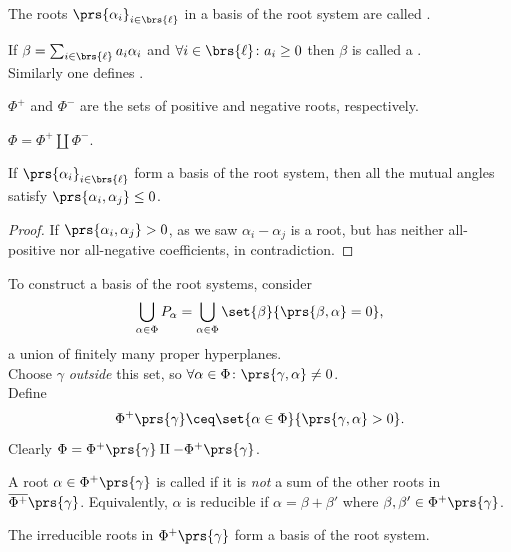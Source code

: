 \documentclass[10pt,a4paper,twoside,openany,hidelinks]{book}
\begin{document}
\begin{definition}
The roots $\prs{\alpha_i}_{i \in \brs{\ell}}$ in a basis of the root system are called .
\end{definition}

\begin{definition}
If $\beta = \sum_{i \in \brs{\ell}} a_i \alpha_i$ and $\forall i \in \brs{\ell} \colon a_i \geq 0$ then $\beta$ is called a .\\
Similarly one defines .
\end{definition}
\begin{definition}
$\Phi^+$ and $\Phi^-$ are the sets of positive and negative roots, respectively.
\end{definition}
\begin{remark}
$\Phi = \Phi^+ \amalg \Phi^-$.
\end{remark}
\begin{proposition}
If $\prs{\alpha_i}_{i\in\brs{\ell}}$ form a basis of the root system, then all the mutual angles satisfy $\prs{\alpha_i, \alpha_j} \leq 0$.
\end{proposition}

\begin{proof}
If $\prs{\alpha_i, \alpha_j} > 0$, as we saw $\alpha_i - \alpha_j$ is a root, but has neither all-positive nor all-negative coefficients, in contradiction.
\end{proof}

To construct a basis of the root systems, consider
\[\bigcup_{\alpha \in \Phi} P_{\alpha} = \bigcup_{\alpha \in \Phi} \set{\beta}{\prs{\beta,\alpha} = 0} \text{,}\]
a union of finitely many proper hyperplanes.\\
Choose $\gamma$ \emph{outside} this set, so $\forall \alpha \in \Phi \colon \prs{\gamma,\alpha} \neq 0$.\\
Define \[\Phi^+\prs{\gamma} \ceq \set{\alpha \in \Phi}{\prs{\gamma,\alpha} > 0} \text{.}\]
Clearly $\Phi = \Phi^+\prs{\gamma} \amalg -\Phi^+\prs{\gamma}$.

\begin{definition}
A root $\alpha \in \Phi^+\prs{\gamma}$ is called  if it is \emph{not} a sum of the other roots in $\overline{\Phi^+}\prs{\gamma}$.
Equivalently, $\alpha$ is reducible if $\alpha = \beta + \beta'$ where $\beta,\beta' \in \Phi^+\prs{\gamma}$.
\end{definition}
\begin{theorem}
The irreducible roots in $\Phi^+\prs{\gamma}$ form a basis of the root system.
\end{theorem}
\end{document}
